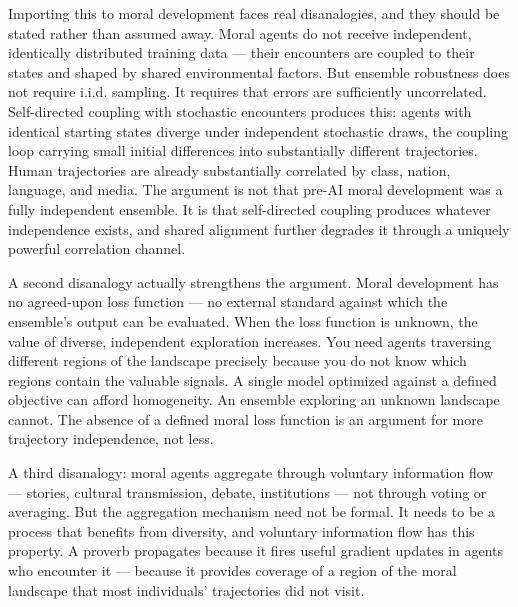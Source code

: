 \documentclass[
]{article}
\begin{document}
Importing this to moral development faces real disanalogies, and they
should be stated rather than assumed away. Moral agents do not receive
independent, identically distributed training data --- their encounters
are coupled to their states and shaped by shared environmental factors.
But ensemble robustness does not require i.i.d. sampling. It requires
that errors are sufficiently uncorrelated. Self-directed coupling with
stochastic encounters produces this: agents with identical starting
states diverge under independent stochastic draws, the coupling loop
carrying small initial differences into substantially different
trajectories. Human trajectories are already substantially correlated by
class, nation, language, and media. The argument is not that pre-AI
moral development was a fully independent ensemble. It is that
self-directed coupling produces whatever independence exists, and shared
alignment further degrades it through a uniquely powerful correlation
channel.

A second disanalogy actually strengthens the argument. Moral development
has no agreed-upon loss function --- no external standard against which
the ensemble's output can be evaluated. When the loss function is
unknown, the value of diverse, independent exploration increases. You
need agents traversing different regions of the landscape precisely
because you do not know which regions contain the valuable signals. A
single model optimized against a defined objective can afford
homogeneity. An ensemble exploring an unknown landscape cannot. The
absence of a defined moral loss function is an argument for more
trajectory independence, not less.

A third disanalogy: moral agents aggregate through voluntary information
flow --- stories, cultural transmission, debate, institutions --- not
through voting or averaging. But the aggregation mechanism need not be
formal. It needs to be a process that benefits from diversity, and
voluntary information flow has this property. A proverb propagates
because it fires useful gradient updates in agents who encounter it ---
because it provides coverage of a region of the moral landscape that
most individuals' trajectories did not visit.
\end{document}
